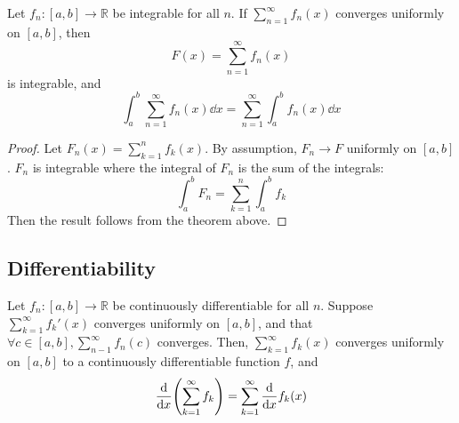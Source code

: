 \begin{corollary}
	Let \( f_n \colon [a,b] \to \mathbb R \) be integrable for all \( n \).
	If \( \sum_{n=1}^\infty f_n(x) \) converges uniformly on \( [a,b] \), then
	\[
		F(x) = \sum_{n=1}^\infty f_n(x)
	\]
	is integrable, and
	\[
		\int_a^b \sum_{n=1}^\infty f_n(x) \dd{x} = \sum_{n=1}^\infty \int_a^b f_n(x) \dd{x}
	\]
\end{corollary}
\begin{proof}
	Let \( F_n(x) = \sum_{k=1}^n f_k(x) \).
	By assumption, \( F_n \to F \) uniformly on \( [a,b] \).
	\( F_n \) is integrable where the integral of \( F_n \) is the sum of the integrals:
	\[
		\int_a^b F_n = \sum_{k=1}^n \int_a^b f_k
	\]
	Then the result follows from the theorem above.
\end{proof}

\subsection{Differentiability}
\begin{theorem}
	Let \( f_n \colon [a,b] \to \mathbb R \) be continuously differentiable for all \( n \).
	Suppose \( \sum_{k=1}^\infty f_k'(x) \) converges uniformly on \( [a,b] \), and that \( \forall c \in [a,b], \sum_{n-1}^\infty f_n(c) \) converges.
	Then, \( \sum_{k=1}^\infty f_k(x) \) converges uniformly on \( [a,b] \) to a continuously differentiable function \( f \), and
	\[
		\dv{x} \qty(\sum_{k=1}^\infty f_k) = \sum_{k=1}^\infty \dv{x} f_k(x)
	\]
\end{theorem}

